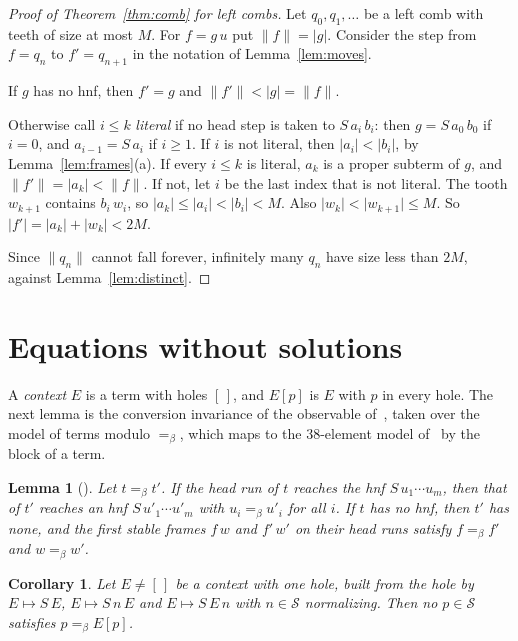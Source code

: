\documentclass[11pt]{amsart}
\newtheorem{lemma}[theorem]{Lemma}
\newtheorem{corollary}[theorem]{Corollary}
\theoremstyle{definition}
\newcommand{\Ter}{\mathcal S}
\newcommand{\conv}{=_\beta}
\newcommand{\sz}[1]{\lvert#1\rvert}
\begin{document}
\begin{proof}[Proof of Theorem~\ref{thm:comb} for left combs]
Let $q_0,q_1,\dots$ be a left comb with teeth of size at most $M$. For $f=g\,u$ put $\|f\|=\sz g$. Consider the
step from $f=q_n$ to $f'=q_{n+1}$ in the notation of Lemma~\ref{lem:moves}.

If $g$ has no hnf, then $f'=g$ and $\|f'\|<\sz g=\|f\|$.

Otherwise call $i\le k$ \emph{literal} if no head step is taken to $S\,a_i\,b_i$: then
$g=S\,a_0\,b_0$ if $i=0$, and $a_{i-1}=S\,a_i$ if $i\ge1$. If $i$ is not literal, then $\sz{a_i}<\sz{b_i}$, by
Lemma~\ref{lem:frames}(a). If every $i\le k$ is literal, $a_k$ is a proper subterm of $g$, and
$\|f'\|=\sz{a_k}<\|f\|$. If not, let $i$ be the last index that is not literal. The tooth $w_{k+1}$
contains $b_i\,w_i$, so $\sz{a_k}\le\sz{a_i}<\sz{b_i}<M$. Also $\sz{w_k}<\sz{w_{k+1}}\le M$. So
$\sz{f'}=\sz{a_k}+\sz{w_k}<2M$.

Since $\|q_n\|$ cannot fall forever, infinitely many $q_n$ have size less than $2M$, against
Lemma~\ref{lem:distinct}.
\end{proof}

\section{Equations without solutions}\label{sec:cor}

A \emph{context} $E$ is a term with holes $[\,]$, and $E[p]$ is $E$ with $p$ in every hole. The next lemma is the conversion invariance
of the observable of~\citep{s6}, taken over the model of terms modulo $\conv$, which maps to the 38-element model of~\citep{s1} by the block of a term.

\begin{lemma}[\citep{s6}]\label{lem:invariant}
Let $t\conv t'$. If the head run of $t$ reaches the hnf $S\,u_1\cdots u_m$, then that of $t'$ reaches an hnf $S\,u'_1\cdots u'_m$
with $u_i\conv u'_i$ for all $i$. If $t$ has no hnf, then $t'$ has none, and the first stable
frames $f\,w$ and $f'\,w'$ on their head runs satisfy $f\conv f'$ and $w\conv w'$.
\end{lemma}

\begin{corollary}\label{cor:hnf}
Let $E\ne[\,]$ be a context with one hole, built from the hole by $E\mapsto S\,E$,
$E\mapsto S\,n\,E$ and $E\mapsto S\,E\,n$ with $n\in\Ter$ normalizing. Then no $p\in\Ter$ satisfies
$p\conv E[p]$.
\end{corollary}
\end{document}
